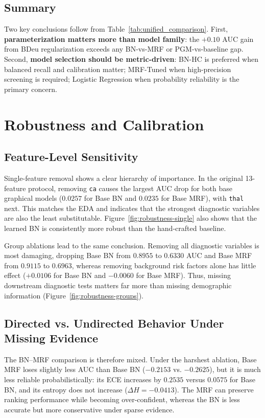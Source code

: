 \documentclass{article}
\begin{document}
\subsection{Summary}

Two key conclusions follow from Table~\ref{tab:unified_comparison}. First, \textbf{parameterization matters more than model family}: the $+0.10$ AUC gain from BDeu regularization exceeds any BN-vs-MRF or PGM-vs-baseline gap. Second, \textbf{model selection should be metric-driven}: BN-HC is preferred when balanced recall and calibration matter; MRF-Tuned when high-precision screening is required; Logistic Regression when probability reliability is the primary concern.

\section{Robustness and Calibration}

\subsection{Feature-Level Sensitivity}

Single-feature removal shows a clear hierarchy of importance. In the original 13-feature protocol, removing \texttt{ca} causes the largest AUC drop for both base graphical models ($0.0257$ for Base BN and $0.0235$ for Base MRF), with \texttt{thal} next. This matches the EDA and indicates that the strongest diagnostic variables are also the least substitutable. Figure~\ref{fig:robustness-single} also shows that the learned BN is consistently more robust than the hand-crafted baseline.

Group ablations lead to the same conclusion. Removing all diagnostic variables is most damaging, dropping Base BN from $0.8955$ to $0.6330$ AUC and Base MRF from $0.9115$ to $0.6963$, whereas removing background risk factors alone has little effect ($+0.0106$ for Base BN and $-0.0060$ for Base MRF). Thus, missing downstream diagnostic tests matters far more than missing demographic information (Figure~\ref{fig:robustness-groups}).

\subsection{Directed vs. Undirected Behavior Under Missing Evidence}

The BN--MRF comparison is therefore mixed. Under the harshest ablation, Base MRF loses slightly less AUC than Base BN ($-0.2153$ vs. $-0.2625$), but it is much less reliable probabilistically: its ECE increases by $0.2535$ versus $0.0575$ for Base BN, and its entropy does not increase ($\Delta H=-0.0413$). The MRF can preserve ranking performance while becoming over-confident, whereas the BN is less accurate but more conservative under sparse evidence.
\end{document}

